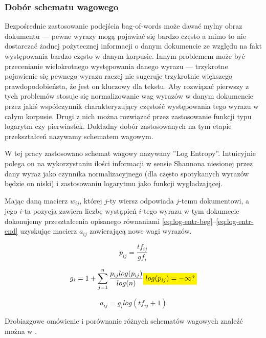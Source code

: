 \documentclass[11pt,a4paper]{article}
\newcommand{\todo}[1]{\colorbox{yellow}{#1}}
\begin{document}
\subsubsection{Dobór schematu wagowego}
\label{weighting}

Bezpośrednie zastosowanie podejścia bag-of-words może dawać mylny obraz
dokumentu --- pewne wyrazy mogą pojawiać się bardzo często a mimo to nie
dostarczać żadnej pożytecznej informacji o danym dokumencie ze względu na fakt
występowania bardzo często w danym korpusie. Innym problemem może być
przecenianie wielokrotnego występowania danego wyrazu --- trzykrotne pojawienie
się pewnego wyrazu raczej nie sugeruje trzykrotnie większego prawdopodobieństa,
że jest on kluczowy dla tekstu. Aby rozwiązać pierwszy z tych problemów stosuje
się normalizowanie wag wyrazów w danym dokumencie przez jakiś współczynnik
charakteryzujący częstość występowania tego wyrazu w całym korpusie. Drugi z
nich można rozwiązać przez zastosowanie funkcji typu logarytm czy pierwiastek.
Dokładny dobór zastosowanych na tym etapie przekształceń nazywamy schematem
wagowym.

W tej pracy zastosowano schemat wagowy nazywany ''Log Entropy''.  Intuicyjnie
polega on na wykorzystaniu ilości informacji w sensie Shannona niesionej przez
dany wyraz jako czynnika normalizacyjnego (dla często spotykanych wyrazów
będzie on niski) i zastosowaniu logarytmu jako funkcji wygładzającej.

Mając daną macierz $w_{ij}$, której $j$-ty wiersz odpowiada $j$-temu
dokumentowi, a jego $i$-ta pozycja zawiera liczbę wystąpień $i$-tego wyrazu w
tym dokumecie dokonujemy przeształcenia opisanego równaniami
\ref{eq:log-entr-beg}--\ref{eq:log-entr-end} uzyskując macierz $a_{ij}$
zawierającą nowe wagi wyrazów.

\begin{equation}
  \label{eq:log-entr-beg}
  p_{ij} = \frac{tf_{ij}}{gf_i}
\end{equation}

\begin{equation}
  g_i = 1 + \sum_{j=1}^n \frac{p_{ij} log(p_{ij})}{log(n)}
  \todo{$log(p_{ij}) = -\infty?$}
\end{equation}

\begin{equation}
  \label{eq:log-entr-end}
  a_{ij} = g_i log(tf_{ij} + 1)
\end{equation}

Drobiazgowe omówienie i porównanie różnych schematów wagowych znaleźć moż\-na w
\cite{figiel}.
\end{document}
